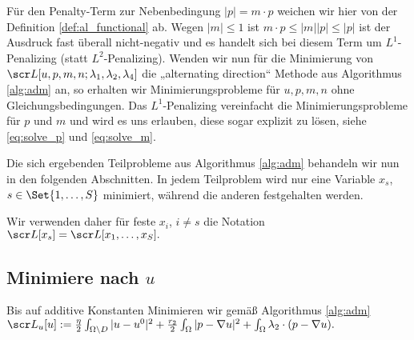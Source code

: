 \documentclass{mythesis}
\begin{document}
Für den Penalty-Term zur Nebenbedingung $|p| = m \cdot p$ weichen wir hier von der Definition \ref{def:al_functional} ab.
Wegen $|m| \le 1$ ist $m \cdot p \le |m| |p| \le |p|$ ist der Ausdruck fast überall nicht-negativ und es handelt sich bei diesem Term um $L^1$-Penalizing (statt $L^2$-Penalizing).
Wenden wir nun für die Minimierung von $\scr L[u,p,m,n;\lambda_1,\lambda_2,\lambda_4]$ die „alternating direction“ Methode aus Algorithmus \ref{alg:adm} an, so erhalten wir Minimierungsprobleme für $u, p, m, n$ ohne Gleichungsbedingungen.
Das $L^1$-Penalizing vereinfacht die Minimierungsprobleme für $p$ und $m$ und wird es uns erlauben, diese sogar explizit zu lösen, siehe \eqref{eq:solve_p} und \eqref{eq:solve_m}.


Die sich ergebenden Teilprobleme aus Algorithmus \ref{alg:adm} behandeln wir nun in den folgenden Abschnitten.
In jedem Teilproblem wird nur eine Variable $x_s$, $s \in \Set{1, \dotsc, S}$ minimiert, während die anderen festgehalten werden.

Wir verwenden daher für feste $x_i$, $i \neq s$ die Notation
\begin{math}
    \scr L[x_s] = \scr L[x_1, \dotsc, x_S].
\end{math}


\subsection*{Minimiere nach $u$}

Bis auf additive Konstanten Minimieren wir gemäß Algorithmus \ref{alg:adm}
\begin{math}
    \scr L_u[u] :=
    \frac{\eta}{2} \int_{\Omega \setminus D} |u - u^0|^2
    + \frac{r_2}{2} \int_\Omega |p - \nabla u|^2
    + \int_\Omega \lambda_2 \cdot (p - \nabla u).
\end{math}
\end{document}

